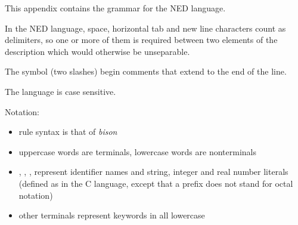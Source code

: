 \label{cha:ned-language-grammar}

This appendix contains the grammar for the NED language.

In the NED language, space, horizontal tab and new line characters count
as delimiters, so one or more of them is required between two elements of the
description which would otherwise be unseparable.

The \ttt{//} symbol (two slashes) begin comments that extend to the end of the line.

The language is case sensitive.

Notation:
\begin{itemize}
  \item rule syntax is that of \textit{bison}
  \item uppercase words are terminals, lowercase words are nonterminals
  \item {}, , ,
         represent identifier names and string,
        integer and real number literals (defined as in the C language,
        except that a  prefix does not stand for octal notation)
  \item other terminals represent keywords in all lowercase
\end{itemize}


%
%
%
%
%

